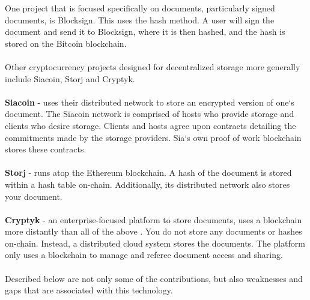 One project that is focused specifically on documents, particularly signed documents, is Blocksign\cite{art6}. This uses the hash method. A user will sign the document and send it to Blocksign, where it is then hashed, and the hash is stored on the Bitcoin blockchain.\\\\
Other cryptocurrency projects designed for decentralized storage more generally include Siacoin, Storj and Cryptyk.\\\\
\textbf{Siacoin}\cite{art7} - uses their distributed network to store an encrypted version of one`s document. The Siacoin network is comprised of hosts who provide storage and clients who desire storage. Clients and hosts agree upon contracts detailing the commitments made by the storage providers. Sia`s own proof of work blockchain stores these contracts.\\\\
\textbf{Storj}\cite{art8} - runs atop the Ethereum\cite{art9} blockchain. A hash of the document is stored within a hash table on-chain. Additionally, its distributed network also stores your document.\\\\
\textbf{Cryptyk}\cite{art10} - an enterprise-focused platform to store documents, uses a blockchain more distantly than all of the above	. You do not store any documents or hashes on-chain. Instead, a distributed cloud system stores the documents. The platform only uses a blockchain to manage and referee document access and sharing.\\\\
Described below are not only some of the contributions, but also weaknesses and gaps that are associated with this technology.
